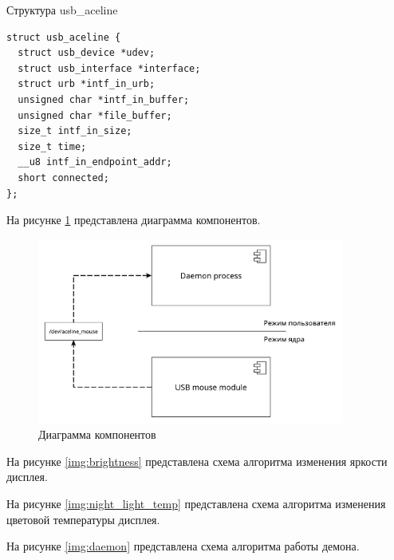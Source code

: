 \begin{longlisting}
	\caption{Структура usb\_aceline}
	\label{lst:usb_aceline}
	\begin{verbatim}
struct usb_aceline {
  struct usb_device *udev;
  struct usb_interface *interface;
  struct urb *intf_in_urb;
  unsigned char *intf_in_buffer;
  unsigned char *file_buffer;
  size_t intf_in_size;
  size_t time;
  __u8 intf_in_endpoint_addr;
  short connected;
};
	\end{verbatim}
\end{longlisting}

На рисунке \ref{img:component} представлена диаграмма компонентов.

\begin{figure}[!htb]\centering
	\includegraphics[width=0.9\textwidth]{../img/component.pdf}
	\caption{Диаграмма компонентов}
	\label{img:component}
\end{figure}

На рисунке \ref{img:brightness} представлена схема алгоритма изменения яркости дисплея.

На рисунке \ref{img:night_light_temp} представлена схема алгоритма изменения цветовой температуры дисплея.

На рисунке \ref{img:daemon} представлена схема алгоритма работы демона.

